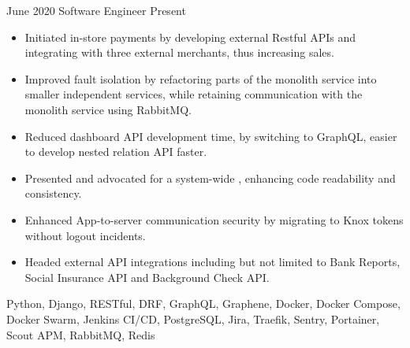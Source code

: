 %
%
%


\begin{experiences}
    \experience
        {June 2020}
        {Software Engineer}
        {}
        {Present}
        {
            \begin{itemize}
                \item Initiated in-store payments by developing external Restful APIs and
                integrating with three external merchants, thus increasing sales.
                \item Improved fault isolation by refactoring parts of the monolith service into smaller independent services, while retaining communication with the monolith service using RabbitMQ.
                \item Reduced dashboard API development time, by switching to GraphQL, easier to develop nested relation API faster.
                \item Presented and advocated for a system-wide , enhancing code readability and consistency.
                \item Enhanced App-to-server communication security by migrating to Knox tokens without logout incidents.
                \item Headed external API integrations including but not limited to Bank Reports, Social Insurance API and Background Check API.
            \end{itemize}
        }
        {
            Python,
            Django,
            RESTful,
            DRF,
            GraphQL,
            Graphene,
            Docker,
            Docker Compose,
            Docker Swarm,
            Jenkins CI/CD,
            PostgreSQL,
            Jira,
            Traefik,
            Sentry,
            Portainer,
            Scout APM,
            RabbitMQ,
            Redis
        }
    \emptySeparator


\end{experiences}
